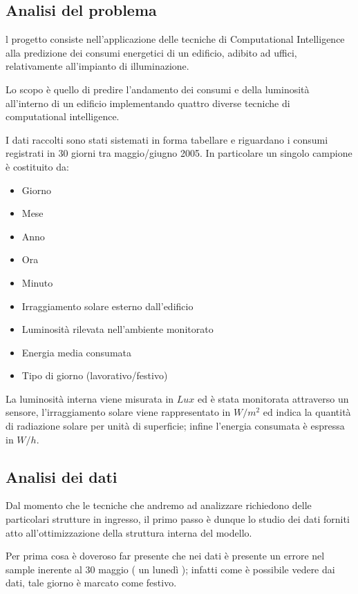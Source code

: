 \subsection{Analisi del problema}
l progetto consiste nell'applicazione delle tecniche di Computational Intelligence alla predizione dei consumi energetici di un edificio, adibito ad uffici, relativamente all'impianto di illuminazione.

Lo scopo è quello di predire l'andamento dei consumi e della luminosità all'interno di un edificio implementando quattro diverse tecniche di computational intelligence.

I dati raccolti sono stati sistemati in forma tabellare e riguardano i consumi registrati in 30 giorni tra maggio/giugno 2005. In particolare un singolo campione è costituito da:

\begin{itemize}
  \item Giorno
  \item Mese
  \item Anno
  \item Ora
  \item Minuto
  \item Irraggiamento solare esterno dall'edificio
  \item Luminosità rilevata nell'ambiente monitorato
  \item Energia media consumata
  \item Tipo di giorno (lavorativo/festivo)
\end{itemize}

La luminosità interna viene misurata in $Lux$ ed è stata monitorata attraverso un sensore, l’irraggiamento solare viene rappresentato in $W/m^2$ ed indica la quantità di radiazione solare per unità di superficie; infine l'energia consumata è espressa in $W/h$.


\subsection{Analisi dei dati}
Dal momento che le tecniche che andremo ad analizzare richiedono delle particolari strutture in ingresso, il primo passo è dunque lo studio dei dati forniti atto all'ottimizzazione della struttura interna del modello.

Per prima cosa è doveroso far presente che nei dati è presente un errore nel sample inerente al 30 maggio ( un lunedì ); infatti come è possibile vedere dai dati, tale giorno è marcato come festivo.

